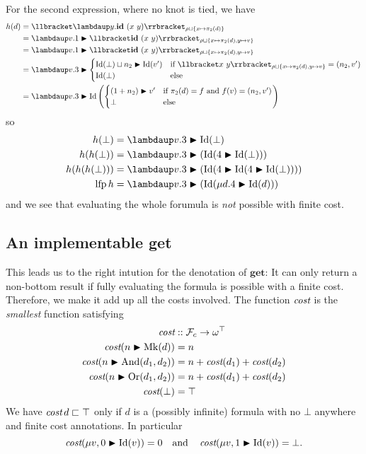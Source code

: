 \documentclass[manuscript,screen,acmsmall,nonacm]{acmart}
\newcommand{\syntax}[1]{\mathbf{#1}}
\newcommand{\slambda}{\syntax{\lambdaup}}
\newcommand{\sGet}{\syntax{get}}
\newcommand{\sId}{\syntax{id}}
\newcommand{\dRBool}{\mathcal F}
\newcommand{\lfp}{\operatorname{lfp}}
\newcommand{\dMk}{\operatorname{Mk}}
\newcommand{\dAnd}{\operatorname{And}}
\newcommand{\dId}{\operatorname{Id}}
\newcommand{\dOr}{\operatorname{Or}}
\newcommand{\D}[1]{\llbracket #1 \rrbracket}
\begin{document}
For the second expression, where no knot is tied, we have
\begin{align*}
h(d)
&= \D{\slambda y. \sId~(x~y)}_{\rho\sqcup\{x \mapsto \pi_2(d)\}} \\
&= \slambda v. 1\bump \D{\sId~(x~y)}_{\rho\sqcup\{x \mapsto \pi_2(d), y\mapsto v\}} \\
&= \slambda v. 1\bump \D{\sId~(x~y)}_{\rho\sqcup\{x \mapsto \pi_2(d), y\mapsto v\}} \\
&= \slambda v. 3\bump \begin{cases}
\dId(\bot) \sqcup n_2 \bump \dId(v') & \text{if } \D{x~y}_{\rho\sqcup\{x \mapsto \pi_2(d), y\mapsto v\}} = (n_2,v')\\
\dId(\bot) & \text{else}
\end{cases}\\
&= \slambda v. 3\bump \dId\left(\begin{cases}
(1 + n_2)\bump v' & \text{if }\pi_2(d) = f \text{ and } f(v) = (n_2,v')\\
\bot & \text{else}
\end{cases}\right)
\end{align*}
so
\begin{align*}
h(\bot) &= \slambda v. 3\bump \dId(\bot) \\
h(h(\bot)) &= \slambda v. 3\bump (\dId(4 \bump \dId(\bot))) \\
h(h(h(\bot))) &= \slambda v. 3\bump (\dId(4 \bump \dId(4 \bump \dId(\bot)))) \\
\lfp h &= \slambda v. 3\bump (\dId(\mu d. 4 \bump \dId(d)))
\end{align*}
and we see that evaluating the whole forumula is \emph{not} possible with finite cost.

\subsection{An implementable get}

This leads us to the right intution for the denotation of $\sGet$: It can only return a non-bottom result if fully evaluating the formula is possible with a finite cost. Therefore, we make it add up all the costs involved. The function $\operatorname{\textit{cost}}$ is the \emph{smallest} function satisfying 
\begin{align*}
\cost &:: \dRBool_c \to \omega^\top \\
\cost(n \bump \dMk(d)) &= n \\
\cost(n \bump \dAnd(d_1,d_2)) &= n + \cost(d_1) + \cost(d_2) \\
\cost(n \bump \dOr(d_1,d_2)) &= n + \cost(d_1) + \cost(d_2)\\
\cost(\bot) &= \top
\end{align*}
We have $\operatorname{\textit{cost}} d \sqsubset \top$ only if $d$ is a (possibly infinite) formula with no $\bot$ anywhere and finite cost annotations. In particular
\[
\cost(\mu v, 0 \bump \dId(v)) = 0
\quad\text{and}\quad
\cost(\mu v, 1 \bump \dId(v)) = \bot.
\]
\end{document}
